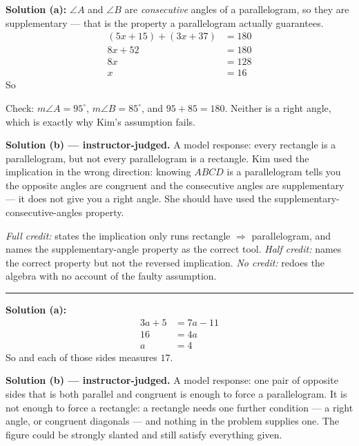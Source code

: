 \documentclass[12pt]{article}
\begin{document}




\textbf{Solution (a):} $\angle A$ and $\angle B$ are \emph{consecutive} angles of a parallelogram, so they are supplementary --- that is the property a parallelogram actually guarantees.
\begin{align*}
  (5x + 15) + (3x + 37) &= 180 \\
  8x + 52 &= 180 \\
  8x &= 128 \\
  x &= 16
\end{align*}
So 

Check: $m\angle A = 95^\circ$, $m\angle B = 85^\circ$, and $95 + 85 = 180$. Neither is a right angle, which is exactly why Kim's assumption fails.

\textbf{Solution (b) --- instructor-judged.} A model response: every rectangle is a parallelogram, but not every parallelogram is a rectangle. Kim used the implication in the wrong direction: knowing $ABCD$ is a parallelogram tells you the opposite angles are congruent and the consecutive angles are supplementary --- it does not give you a right angle. She should have used the supplementary-consecutive-angles property.

\emph{Full credit:} states the implication only runs rectangle $\Rightarrow$ parallelogram, and names the supplementary-angle property as the correct tool. \emph{Half credit:} names the correct property but not the reversed implication. \emph{No credit:} redoes the algebra with no account of the faulty assumption.

\vspace{0.2cm}\noindent\rule{\linewidth}{0.2pt}


\textbf{Solution (a):}
\begin{align*}
  3a + 5 &= 7a - 11 \\
  16 &= 4a \\
  a &= 4
\end{align*}
So  and each of those sides measures $17$.

\textbf{Solution (b) --- instructor-judged.} A model response: one pair of opposite sides that is both parallel and congruent is enough to force a parallelogram. It is not enough to force a rectangle: a rectangle needs one further condition --- a right angle, or congruent diagonals --- and nothing in the problem supplies one. The figure could be strongly slanted and still satisfy everything given.
\end{document}
